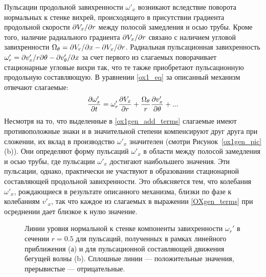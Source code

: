 Пульсации продольной завихренности $\omega'_x$ возникают вследствие поворота нормальных к стенке вихрей, происходящего в присутствии градиента продольной скорости $\partial V_x/ \partial r$ между полосой замедления и осью трубы. Кроме того, наличие радиального градиента $\partial V_x/ \partial r$ связано с наличием угловой завихренности $\Omega_\theta = \partial V_r / \partial x - \partial V_x / \partial r$. Радиальная пульсационная завихренность $\omega'_r = \partial v'_x / r \partial \theta - \partial v'_\theta / \partial x$ за счет первого из слагаемых поворачивает стационарные угловые вихри так, что те также приобретают пульсационную продольную составляющую. В уравнении \eqref{ox1_eq} за описанный механизм отвечают слагаемые:
\begin{equation}\label{ox1gen_add_terms}
\frac{\partial \omega'_x}{\partial t} = \omega'_r \frac {\partial V_x}{\partial r} + \frac{\Omega_\theta}{r} \frac{\partial v'_x}{\partial \theta} + ...
\end{equation}
Несмотря на то, что выделенные в \eqref{ox1gen_add_terms} слагаемые имеют противоположные знаки и в значительной степени компенсируют друг друга при сложении, их вклад в производство $\omega'_x$ значителен (смотри Рисунок~\ref{ox1gen_pic}(b)). Они определяют форму пульсаций $\omega'_x$ в области между полосой замедления и осью трубы, где пульсации $\omega'_x$ достигают наибольшего значения. Эти пульсации, однако, практически не участвуют в образовании стационарной составляющей продольной завихренности. Это объясняется тем, что колебания $\omega'_x$, рождающиеся в результате описанного механизма, близки по фазе к колебаниям $v'_x$, так что каждое из слагаемых в выражении \eqref{OXgen_terms} при осреднении дает близкое к нулю значение.

\begin{figure}
\caption{Линии уровня нормальной к стенке компоненты завихренности $\omega_r'$ в сечении $r = 0.5$ для пульсаций, полученных в рамках линейного приближения (а) и для пульсационной составляющей движения бегущей волны (b). Сплошные линии --- положительные значения, прерывистые --- отрицательные.}
\label{pipetw_or1_pic}
\end{figure}

